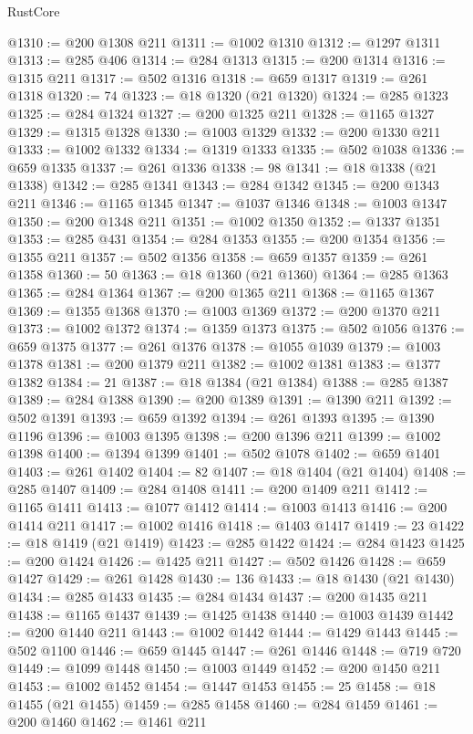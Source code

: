 \begin{lexlean}{RustCore}
\begin{coremodule}
@1310 := @200 @1308 @211
@1311 := @1002 @1310
@1312 := @1297 @1311
@1313 := @285 @406
@1314 := @284 @1313
@1315 := @200 @1314
@1316 := @1315 @211
@1317 := @502 @1316
@1318 := @659 @1317
@1319 := @261 @1318
@1320 := 74
@1323 := @18 @1320 (@21 @1320)
@1324 := @285 @1323
@1325 := @284 @1324
@1327 := @200 @1325 @211
@1328 := @1165 @1327
@1329 := @1315 @1328
@1330 := @1003 @1329
@1332 := @200 @1330 @211
@1333 := @1002 @1332
@1334 := @1319 @1333
@1335 := @502 @1038
@1336 := @659 @1335
@1337 := @261 @1336
@1338 := 98
@1341 := @18 @1338 (@21 @1338)
@1342 := @285 @1341
@1343 := @284 @1342
@1345 := @200 @1343 @211
@1346 := @1165 @1345
@1347 := @1037 @1346
@1348 := @1003 @1347
@1350 := @200 @1348 @211
@1351 := @1002 @1350
@1352 := @1337 @1351
@1353 := @285 @431
@1354 := @284 @1353
@1355 := @200 @1354
@1356 := @1355 @211
@1357 := @502 @1356
@1358 := @659 @1357
@1359 := @261 @1358
@1360 := 50
@1363 := @18 @1360 (@21 @1360)
@1364 := @285 @1363
@1365 := @284 @1364
@1367 := @200 @1365 @211
@1368 := @1165 @1367
@1369 := @1355 @1368
@1370 := @1003 @1369
@1372 := @200 @1370 @211
@1373 := @1002 @1372
@1374 := @1359 @1373
@1375 := @502 @1056
@1376 := @659 @1375
@1377 := @261 @1376
@1378 := @1055 @1039
@1379 := @1003 @1378
@1381 := @200 @1379 @211
@1382 := @1002 @1381
@1383 := @1377 @1382
@1384 := 21
@1387 := @18 @1384 (@21 @1384)
@1388 := @285 @1387
@1389 := @284 @1388
@1390 := @200 @1389
@1391 := @1390 @211
@1392 := @502 @1391
@1393 := @659 @1392
@1394 := @261 @1393
@1395 := @1390 @1196
@1396 := @1003 @1395
@1398 := @200 @1396 @211
@1399 := @1002 @1398
@1400 := @1394 @1399
@1401 := @502 @1078
@1402 := @659 @1401
@1403 := @261 @1402
@1404 := 82
@1407 := @18 @1404 (@21 @1404)
@1408 := @285 @1407
@1409 := @284 @1408
@1411 := @200 @1409 @211
@1412 := @1165 @1411
@1413 := @1077 @1412
@1414 := @1003 @1413
@1416 := @200 @1414 @211
@1417 := @1002 @1416
@1418 := @1403 @1417
@1419 := 23
@1422 := @18 @1419 (@21 @1419)
@1423 := @285 @1422
@1424 := @284 @1423
@1425 := @200 @1424
@1426 := @1425 @211
@1427 := @502 @1426
@1428 := @659 @1427
@1429 := @261 @1428
@1430 := 136
@1433 := @18 @1430 (@21 @1430)
@1434 := @285 @1433
@1435 := @284 @1434
@1437 := @200 @1435 @211
@1438 := @1165 @1437
@1439 := @1425 @1438
@1440 := @1003 @1439
@1442 := @200 @1440 @211
@1443 := @1002 @1442
@1444 := @1429 @1443
@1445 := @502 @1100
@1446 := @659 @1445
@1447 := @261 @1446
@1448 := @719 @720
@1449 := @1099 @1448
@1450 := @1003 @1449
@1452 := @200 @1450 @211
@1453 := @1002 @1452
@1454 := @1447 @1453
@1455 := 25
@1458 := @18 @1455 (@21 @1455)
@1459 := @285 @1458
@1460 := @284 @1459
@1461 := @200 @1460
@1462 := @1461 @211

\end{coremodule}
\end{lexlean}

